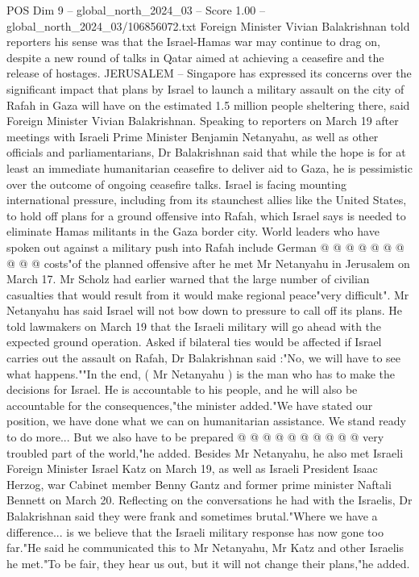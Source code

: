 \begin{textsample}{POS Dim 9 – global\_north\_2024\_03 – Score 1.00 – global\_north\_2024\_03/106856072.txt}  \label{ex:f9_pos_278}
Foreign Minister Vivian Balakrishnan told reporters his sense was that the Israel-Hamas war may continue to drag on, despite a new round of talks in Qatar aimed at achieving a ceasefire and the release of hostages.
JERUSALEM -- Singapore has expressed its concerns over the significant impact that plans by Israel to launch a military assault on the city of Rafah in Gaza will have on the estimated 1.5 million people sheltering there, said Foreign Minister Vivian Balakrishnan.
Speaking to reporters on March 19 after meetings with Israeli Prime Minister Benjamin Netanyahu, as well as other officials and parliamentarians, Dr Balakrishnan said that while the hope is for at least an immediate humanitarian ceasefire to deliver aid to Gaza, he is pessimistic over the outcome of ongoing ceasefire talks.
Israel is facing mounting international pressure, including from its staunchest allies like the United States, to hold off plans for a ground offensive into Rafah, which Israel says is needed to eliminate Hamas militants in the Gaza border city.
World leaders who have spoken out against a military push into Rafah include German @ @ @ @ @ @ @ @ @ @ costs"of the planned offensive after he met Mr Netanyahu in Jerusalem on March 17.
Mr Scholz had earlier warned that the large number of civilian casualties that would result from it would make regional peace"very difficult".
Mr Netanyahu has said Israel will not bow down to pressure to call off its plans.
He told lawmakers on March 19 that the Israeli military will go ahead with the expected ground operation.
Asked if bilateral ties would be affected if Israel carries out the assault on Rafah, Dr Balakrishnan said :"No, we will have to see what happens.""In the end, ( Mr Netanyahu ) is the man who has to make the decisions for Israel.
He is accountable to his people, and he will also be accountable for the consequences,"the minister added."We have stated our position, we have done what we can on humanitarian assistance.
We stand ready to do more...
But we also have to be prepared @ @ @ @ @ @ @ @ @ @ very troubled part of the world,"he added.
Besides Mr Netanyahu, he also met Israeli Foreign Minister Israel Katz on March 19, as well as Israeli President Isaac Herzog, war Cabinet member Benny Gantz and former prime minister Naftali Bennett on March 20.
Reflecting on the conversations he had with the Israelis, Dr Balakrishnan said they were frank and sometimes brutal."Where we have a difference... is we believe that the Israeli military response has now gone too far."He said he communicated this to Mr Netanyahu, Mr Katz and other Israelis he met."To be fair, they hear us out, but it will not change their plans,"he added.

\end{textsample}
